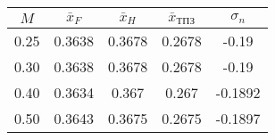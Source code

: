 \begin{tabular}{|c|c|c|c|c|}
\hline
$M$ & $\bar{x}_{F}$ & $\bar{x}_{H}$ & $\bar{x}_{ТПЗ}$ & $\sigma_{n}$ \\ 
\hline
0.25 & 0.3638 & 0.3678 & 0.2678 & -0.19 \\ 
\hline
0.30 & 0.3638 & 0.3678 & 0.2678 & -0.19 \\ 
\hline
0.40 & 0.3634 & 0.367 & 0.267 & -0.1892 \\ 
\hline
0.50 & 0.3643 & 0.3675 & 0.2675 & -0.1897 \\ 
\hline
\end{tabular}